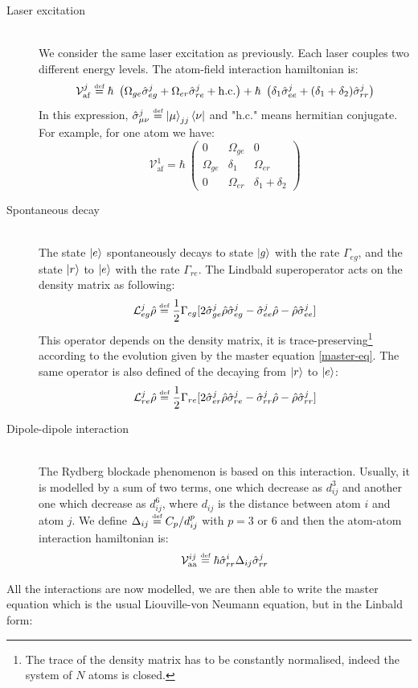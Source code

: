 \documentclass[twoside, open=right
]{scrreprt}
\newcommand{\defi}{\xspace\ensuremath{\overset{\text{\tiny def}}{=}}\xspace}
\newcommand{\ff}{\ensuremath{\ket{g}}\xspace}
\newcommand{\ee}{\ensuremath{\ket{e}}\xspace}
\newcommand{\rr}{\ensuremath{\ket{r}}\xspace}
\newcommand{\Om}{\Omega}
\newcommand{\Ga}{\Gamma}
\newcommand{\hlf}{\frac{1}{2}}
\newcommand{\mc}[1]{\mathcal{#1}}
\newcommand{\sig}{\hat{\sigma}}
\newcommand{\hrho}{\hat{\rho}}
\begin{document}
\begin{description}
  \item[Laser excitation] \hfill \\
  We consider the same laser excitation as previously. Each laser couples two different energy levels. The atom-field interaction hamiltonian is:
  \[\mc{V}^j_{\mathrm{af}} \defi \hbar \ \left(\Om_{ge} \sig_{eg}^j + \Om_{er} \sig_{re}^j + \mathrm{h.c.}\right) + \hbar \ \left(\delta_1 \sig_{ee}^j + (\delta_1+\delta_2) \sig_{rr}^j \right) \]
  In this expression, $\sig_{\mu \nu}^j \defi \ket{\mu}_{jj}\bra{\nu}$ and "h.c." means hermitian conjugate. For example, for one atom we have: \[\mc{V}^1_{\mathrm{af}} = \hbar \ \begin{pmatrix}
0 & \Om_{ge} & 0 \\
\Om_{ge}& \delta_1 & \Om_{er} \\
0 & \Om_{er} & \delta_1 + \delta_2
\end{pmatrix} \]
  \item[Spontaneous decay] \hfill \\
  The state \ee spontaneously decays to state \ff with the rate $\Ga_{eg}$, and the state \rr to \ee with the rate $\Ga_{re}$. The Lindbald superoperator acts on the density matrix as following: 
  \[ \mc{L}_{eg}^j \hrho \defi \hlf \Ga_{eg} [2 \sig_{ge}^j \hrho \sig_{eg}^j - \sig_{ee}^j \hrho - \hrho \sig_{ee}^j] \]
  This operator depends on the density matrix, it is trace-preserving\footnote{The trace of the density matrix has to be constantly normalised, indeed the system of $N$ atoms is closed.} according to the evolution given by the master equation \cref{master-eq}. The same operator is also defined of the decaying from \rr to \ee: \[ \mc{L}_{re}^j \hrho \defi \hlf \Ga_{re} [2 \sig_{er}^j \hrho \sig_{re}^j - \sig_{rr}^j \hrho - \hrho \sig_{rr}^j] \]

  \item[Dipole-dipole interaction] \hfill \\
  The Rydberg blockade phenomenon is based on this interaction. Usually, it is modelled by a sum of two terms, one which decrease as $d_{ij}^3$ and another one which decrease as $d_{ij}^6$, where $d_{ij}$ is the distance between atom $i$ and atom $j$. We define $\Delta_{ij} \defi C_p/d_{ij}^{p}$ with $p = 3 \text{~or~} 6$ and then the atom-atom interaction hamiltonian is:
  \[ \mc{V}_{\mathrm{aa}}^{ij} \defi \hbar  \sig_{rr}^i \Delta_{ij} \sig_{rr}^j \]
\end{description}

\par All the interactions are now modelled, we are then able to write the master equation which is the usual Liouville-von Neumann equation, but in the Linbald form:
\end{document}
